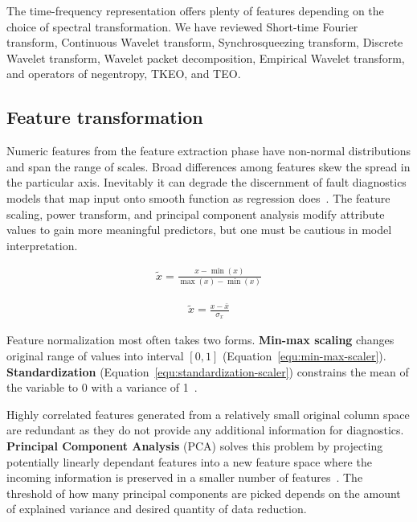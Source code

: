The time-frequency representation offers plenty of features depending on the choice of spectral transformation. We have reviewed Short-time Fourier transform, Continuous Wavelet transform, Synchrosqueezing transform, Discrete Wavelet transform, Wavelet packet decomposition, Empirical Wavelet transform, and operators of negentropy, TKEO, and TEO.

% 
% 
%

\subsection{Feature transformation}
Numeric features from the feature extraction phase have non-normal distributions and span the range of scales. Broad differences among features skew the spread in the particular axis. Inevitably it can degrade the discernment of fault diagnostics models that map input onto smooth function as regression does~\cite{zheng_feature_2018}. The feature scaling, power transform, and principal component analysis modify attribute values to gain more meaningful predictors, but one must be cautious in model interpretation.

\begin{ceqn}\begin{align}
\widetilde{x} = \frac{x - \min(x)}{\max(x) - \min(x)}
\label{equ:min-max-scaler}
\end{align}\end{ceqn}

\begin{ceqn}\begin{align}
\widetilde{x} = \frac{x - \bar{x}}{\sigma_x}
\label{equ:standardization-scaler}
\end{align}\end{ceqn}

Feature normalization most often takes two forms. \textbf{Min-max scaling} changes original range of values into interval $[0, 1]$ (Equation~\ref{equ:min-max-scaler}). \textbf{Standardization} (Equation~\ref{equ:standardization-scaler}) constrains the mean of the variable to 0 with a variance of 1~\cite{zheng_feature_2018}.

Highly correlated features generated from a relatively small original column space are redundant as they do not provide any additional information for diagnostics. \textbf{Principal Component Analysis} (PCA) solves this problem by projecting potentially linearly dependant features into a new feature space where the incoming information is preserved in a smaller number of features~\cite{zheng_feature_2018}. The threshold of how many principal components are picked depends on the amount of explained variance and desired quantity of data reduction. 

